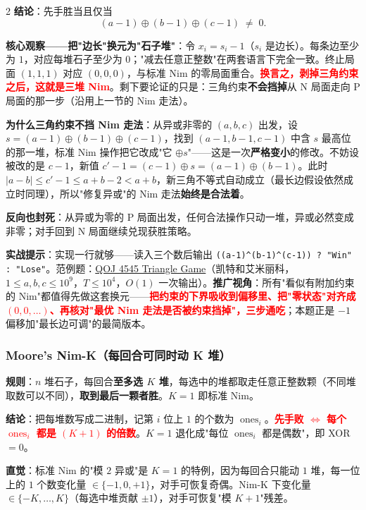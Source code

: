 \begin{multicols*}{2}
		\textbf{结论}：先手胜当且仅当
		\[
			(a-1) \oplus (b-1) \oplus (c-1) \;\neq\; 0.
		\]

		\textbf{核心观察——把"边长"换元为"石子堆"}：令 $x_i = s_i - 1$（$s_i$ 是边长）。每条边至少为 $1$，对应每堆石子至少为 $0$；"减去任意正整数"在两套语言下完全一致。终止局面 $(1,1,1)$ 对应 $(0,0,0)$，与标准 Nim 的零局面重合。\textcolor{red}{\textbf{换言之，剥掉三角约束之后，这就是三堆 Nim}}。剩下要论证的只是：三角约束\textbf{不会挡掉}从 N 局面走向 P 局面的那一步（沿用上一节的 Nim 走法）。

		\textbf{为什么三角约束不挡 Nim 走法}：从异或非零的 $(a,b,c)$ 出发，设 $s = (a-1)\oplus(b-1)\oplus(c-1)$，找到 $(a-1, b-1, c-1)$ 中含 $s$ 最高位的那一堆，标准 Nim 操作把它改成"它 $\oplus s$"——这是一次\textbf{严格变小}的修改。不妨设被改的是 $c-1$，新值 $c' - 1 = (c-1)\oplus s = (a-1)\oplus(b-1)$。此时 $|a - b| \le c' - 1 \le a + b - 2 < a + b$，新三角不等式自动成立（最长边假设依然成立时同理），所以"修复异或"的 Nim 走法\textbf{始终是合法着}。

		\textbf{反向也封死}：从异或为零的 P 局面出发，任何合法操作只动一堆，异或必然变成非零；对手回到 N 局面继续兑现获胜策略。

		\textbf{实战提示}：实现一行就够——读入三个数后输出 \texttt{((a-1)\^{}(b-1)\^{}(c-1)) ? "Win" : "Lose"}。范例题：\href{https://qoj.ac/problem/4545}{QOJ 4545 Triangle Game}（凯特和艾米丽科，$1 \le a,b,c \le 10^9$，$T \le 10^4$，$O(1)$ 一次输出）。\textbf{推广视角}：所有"看似有附加约束的 Nim"都值得先做这套换元——\textcolor{red}{\textbf{把约束的下界吸收到偏移里、把"零状态"对齐成 $(0,0,\dots)$、再核对"最优 Nim 走法是否被约束挡掉"，三步通吃}}；本题正是 $-1$ 偏移加"最长边可调"的最简版本。

		\subsubsection{Moore's Nim-K（每回合可同时动 K 堆）}

		\textbf{规则}：$n$ 堆石子，每回合\textbf{至多选 $K$ 堆}，每选中的堆都取走任意正整数颗（不同堆取数可以不同），\textbf{取到最后一颗者胜}。$K=1$ 即标准 Nim。

		\textbf{结论}：把每堆数写成二进制，记第 $i$ 位上 $1$ 的个数为 $\operatorname{ones}_i$。\textcolor{red}{\textbf{先手败 $\iff$ 每个 $\operatorname{ones}_i$ 都是 $(K+1)$ 的倍数}}。$K=1$ 退化成"每位 $\operatorname{ones}_i$ 都是偶数"，即 XOR $=0$。

		\textbf{直觉}：标准 Nim 的"模 $2$ 异或"是 $K=1$ 的特例，因为每回合只能动 $1$ 堆，每一位上的 $1$ 个数变化量 $\in \{-1, 0, +1\}$，对手可恢复奇偶。Nim-K 下变化量 $\in \{-K, \dots, K\}$（每选中堆贡献 $\pm 1$），对手可恢复"模 $K+1$"残差。


\end{multicols*}

